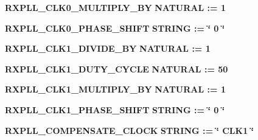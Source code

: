\begin{DoxyCompactItemize}
\item 
{\bf R\+X\+P\+L\+L\+\_\+\+C\+L\+K0\+\_\+\+M\+U\+L\+T\+I\+P\+L\+Y\+\_\+\+BY} {\bfseries {\bfseries \textcolor{comment}{N\+A\+T\+U\+R\+AL}\textcolor{vhdlchar}{ }\textcolor{vhdlchar}{ }\textcolor{vhdlchar}{\+:}\textcolor{vhdlchar}{=}\textcolor{vhdlchar}{ }\textcolor{vhdlchar}{ } \textcolor{vhdldigit}{1} \textcolor{vhdlchar}{ }}}
\item 
{\bf R\+X\+P\+L\+L\+\_\+\+C\+L\+K0\+\_\+\+P\+H\+A\+S\+E\+\_\+\+S\+H\+I\+FT} {\bfseries {\bfseries \textcolor{comment}{S\+T\+R\+I\+NG}\textcolor{vhdlchar}{ }\textcolor{vhdlchar}{ }\textcolor{vhdlchar}{\+:}\textcolor{vhdlchar}{=}\textcolor{vhdlchar}{ }\textcolor{vhdlchar}{ }\textcolor{vhdlchar}{ }\textcolor{vhdlchar}{ }\textcolor{keyword}{\char`\"{} 0 \char`\"{}}\textcolor{vhdlchar}{ }}}
\item 
{\bf R\+X\+P\+L\+L\+\_\+\+C\+L\+K1\+\_\+\+D\+I\+V\+I\+D\+E\+\_\+\+BY} {\bfseries {\bfseries \textcolor{comment}{N\+A\+T\+U\+R\+AL}\textcolor{vhdlchar}{ }\textcolor{vhdlchar}{ }\textcolor{vhdlchar}{\+:}\textcolor{vhdlchar}{=}\textcolor{vhdlchar}{ }\textcolor{vhdlchar}{ } \textcolor{vhdldigit}{1} \textcolor{vhdlchar}{ }}}
\item 
{\bf R\+X\+P\+L\+L\+\_\+\+C\+L\+K1\+\_\+\+D\+U\+T\+Y\+\_\+\+C\+Y\+C\+LE} {\bfseries {\bfseries \textcolor{comment}{N\+A\+T\+U\+R\+AL}\textcolor{vhdlchar}{ }\textcolor{vhdlchar}{ }\textcolor{vhdlchar}{\+:}\textcolor{vhdlchar}{=}\textcolor{vhdlchar}{ }\textcolor{vhdlchar}{ } \textcolor{vhdldigit}{50} \textcolor{vhdlchar}{ }}}
\item 
{\bf R\+X\+P\+L\+L\+\_\+\+C\+L\+K1\+\_\+\+M\+U\+L\+T\+I\+P\+L\+Y\+\_\+\+BY} {\bfseries {\bfseries \textcolor{comment}{N\+A\+T\+U\+R\+AL}\textcolor{vhdlchar}{ }\textcolor{vhdlchar}{ }\textcolor{vhdlchar}{\+:}\textcolor{vhdlchar}{=}\textcolor{vhdlchar}{ }\textcolor{vhdlchar}{ } \textcolor{vhdldigit}{1} \textcolor{vhdlchar}{ }}}
\item 
{\bf R\+X\+P\+L\+L\+\_\+\+C\+L\+K1\+\_\+\+P\+H\+A\+S\+E\+\_\+\+S\+H\+I\+FT} {\bfseries {\bfseries \textcolor{comment}{S\+T\+R\+I\+NG}\textcolor{vhdlchar}{ }\textcolor{vhdlchar}{ }\textcolor{vhdlchar}{\+:}\textcolor{vhdlchar}{=}\textcolor{vhdlchar}{ }\textcolor{vhdlchar}{ }\textcolor{vhdlchar}{ }\textcolor{vhdlchar}{ }\textcolor{keyword}{\char`\"{} 0 \char`\"{}}\textcolor{vhdlchar}{ }}}
\item 
{\bf R\+X\+P\+L\+L\+\_\+\+C\+O\+M\+P\+E\+N\+S\+A\+T\+E\+\_\+\+C\+L\+O\+CK} {\bfseries {\bfseries \textcolor{comment}{S\+T\+R\+I\+NG}\textcolor{vhdlchar}{ }\textcolor{vhdlchar}{ }\textcolor{vhdlchar}{\+:}\textcolor{vhdlchar}{=}\textcolor{vhdlchar}{ }\textcolor{vhdlchar}{ }\textcolor{vhdlchar}{ }\textcolor{vhdlchar}{ }\textcolor{keyword}{\char`\"{} C\+L\+K1 \char`\"{}}\textcolor{vhdlchar}{ }}}

\end{DoxyCompactItemize}
